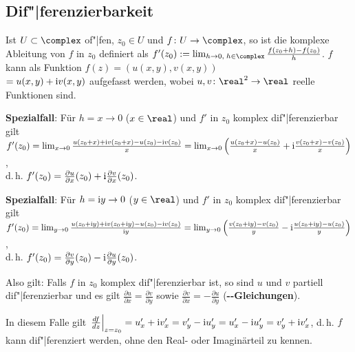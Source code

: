 \pagebreak

\subsection{%
    Dif"|ferenzierbarkeit%
}

Ist $U \subset \complex$ of"|fen, $z_0 \in U$ und
$f\colon U \rightarrow \complex$, so ist die komplexe Ableitung von $f$ in
$z_0$ definiert als
$f'(z_0) := \lim_{h \to 0,\; h \in \complex} \frac{f(z_0 + h) - f(z_0)}{h}$.
$f$ kann als Funktion $f(z) = (u(x, y), v(x, y))$\\
$= u(x, y) + \mathrm{i} v(x, y)$
aufgefasst werden, wobei $u, v\colon \real^2 \rightarrow \real$ reelle
Funktionen sind.

\linie

\textbf{Spezialfall}:
Für $h = x \to 0$ ($x \in \real$) und
$f'$ in $z_0$ komplex dif"|ferenzierbar gilt\\
$f'(z_0)
= \lim_{x \to 0} \frac{u(z_0 + x) + \mathrm{i} v(z_0 + x) - u(z_0) - \mathrm{i} v(z_0)}{x}
= \lim_{x \to 0} \left(\frac{u(z_0 + x) - u(z_0)}{x} +
\mathrm{i} \frac{v(z_0 + x) - v(z_0)}{x}\right)$,\\
d.\,h. $f'(z_0) = \frac{\partial u}{\partial x}(z_0) +
\mathrm{i} \frac{\partial v}{\partial x}(z_0)$.

\textbf{Spezialfall}:
Für $h = \mathrm{i} y \to 0$ ($y \in \real$) und
$f'$ in $z_0$ komplex dif"|ferenzierbar gilt\\
$f'(z_0)
= \lim_{y \to 0} \frac{u(z_0 + \mathrm{i} y) + \mathrm{i} v(z_0 + \mathrm{i} y) -
u(z_0) - \mathrm{i} v(z_0)}{\mathrm{i} y}
= \lim_{y \to 0} \left(\frac{v(z_0 + \mathrm{i} y) - v(z_0)}{y} -
\mathrm{i} \frac{u(z_0 + \mathrm{i} y) - u(z_0)}{y}\right)$,\\
d.\,h. $f'(z_0) = \frac{\partial v}{\partial y}(z_0) -
\mathrm{i} \frac{\partial u}{\partial y}(z_0)$.

\linie

Also gilt:
Falls $f$ in $z_0$ komplex dif"|ferenzierbar ist, so sind $u$ und $v$ partiell
dif"|ferenzierbar und es gilt
$\frac{\partial u}{\partial x} = \frac{\partial v}{\partial y}$ sowie
$\frac{\partial v}{\partial x} = -\frac{\partial u}{\partial y}$
(\textbf{--Gleichungen}).

In diesem Falle gilt $\left.\frac{df}{dz}\right|_{z=z_0} = u_x' + \mathrm{i} v_x' =
v_y' - \mathrm{i} u_y' = u_x' - \mathrm{i} u_y' = v_y' + \mathrm{i} v_x'$, d.\,h. $f$ kann
dif"|ferenziert werden, ohne den Real- oder Imaginärteil zu kennen.

\linie

